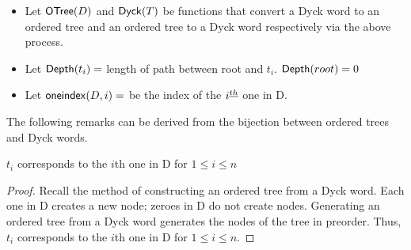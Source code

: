 \begin{itemize}
    \item Let $\mathsf{OTree}{(D)}$ and $\mathsf{Dyck}{(T)}$ be functions that convert a Dyck word to an ordered tree and an ordered tree to a Dyck word respectively via the above process.
    \item Let $\mathsf{Depth}{(t_i)}=$ length of path between root and $t_i$. $\mathsf{Depth}{(root)}=0$
    \item Let $\mathsf{oneindex}({D}, i)=$ be the index of the $i^{\underline{th}}{}$ one in D.
\end{itemize}

\bigskip


The following remarks can be derived from the bijection between ordered trees and Dyck words. 


\begin{remark}
    $t_i$ corresponds to the $i$th one in D for $1 \le i \le n$
\end{remark}
\begin{proof}
    Recall the method of constructing an ordered tree from a Dyck word.  Each one in D creates a new node; zeroes in D do not create nodes.  Generating an ordered tree from a Dyck word generates the nodes of the tree in preorder.  Thus, $t_i$ corresponds to the $i$th one in D for $1 \le i \le n$.
\end{proof}

